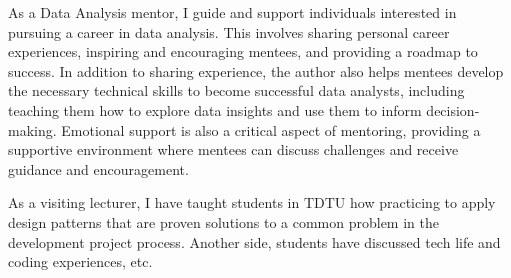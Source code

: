 \documentclass[10pt,a4paper,ragged2e,withhyper]{altacv}
\begin{document}
\begin{paracol}{2}
\bigskip


\begin{minipage}{\linewidth}
\justifying
As a Data Analysis mentor, I guide and support individuals interested in pursuing a career in data analysis. This involves sharing personal career experiences, inspiring and encouraging mentees, and providing a roadmap to success. In addition to sharing experience, the author also helps mentees develop the necessary technical skills to become successful data analysts, including teaching them how to explore data insights and use them to inform decision-making. Emotional support is also a critical aspect of mentoring, providing a supportive environment where mentees can discuss challenges and receive guidance and encouragement.
\end{minipage}

\bigskip

\divider


\begin{minipage}{\linewidth}
\justifying
As a visiting lecturer, I have taught students in TDTU how practicing to apply design patterns that are proven solutions to a common problem in the development project process. Another side, students have discussed tech life and coding experiences, etc.
\end{minipage}

\bigskip

\divider

\medskip 



\end{paracol}
\end{document}
